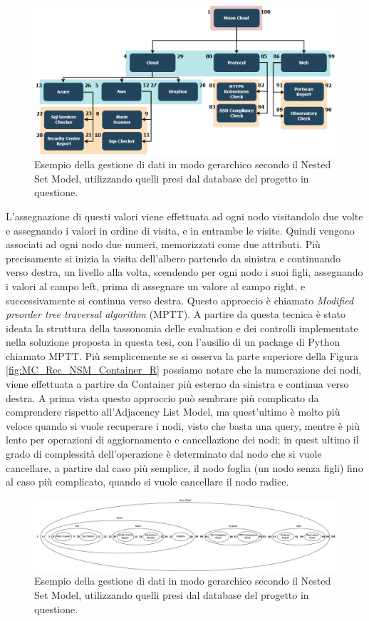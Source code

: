 \begin{figure}[ht!]
    \includegraphics[scale=0.40]{images/MC_Rec_NSM_Tree.png}
    \caption{Esempio della gestione di dati in modo gerarchico secondo il Nested Set Model, utilizzando quelli presi dal database del 
    progetto in questione.}
    \label{fig:MC_Rec_NSM_Tree}
\end{figure}
\hfill\break
L'assegnazione di questi valori viene effettuata ad ogni nodo visitandolo due volte e assegnando i valori in ordine di visita, e in entrambe le visite. 
Quindi vengono associati ad ogni nodo due numeri, memorizzati come due attributi.
Più precisamente si inizia la visita dell'albero partendo da sinistra e continuando verso destra, un livello alla volta, scendendo per ogni
nodo i suoi figli, assegnando i valori al campo left, prima di assegnare un valore al campo right, e successivamente si continua verso 
destra. Questo approccio è chiamato \textit{Modified preorder tree traversal algorithm} (MPTT). A partire da questa tecnica è stato 
ideata la struttura della tassonomia delle evaluation e dei controlli implementate nella soluzione proposta in questa tesi, con 
l'ausilio di un package di Python chiamato MPTT.\hfill\break
Più semplicemente se si osserva la parte superiore della Figura \ref{fig:MC_Rec_NSM_Container_R} possiamo notare che la numerazione dei nodi, viene
effettuata a partire da Container più esterno da sinistra e continua verso destra.\hfill\break
A prima vista questo approccio può sembrare più complicato da comprendere rispetto all'Adjacency List Model, ma quest'ultimo è
molto più veloce quando si vuole recuperare i nodi, visto che basta una query, mentre è più lento per operazioni di aggiornamento e 
cancellazione dei nodi; in quest ultimo il grado di complessità dell'operazione è determinato dal nodo che si vuole cancellare, a 
partire dal caso più semplice, il nodo foglia (un nodo senza figli) fino al caso più complicato, quando si vuole cancellare il nodo 
radice.
%
\begin{figure}
    \centering
    \includegraphics[scale=0.4]{images/MC_Rec_NSM_Container.png}
    \caption{Esempio della gestione di dati in modo gerarchico secondo il Nested Set Model, utilizzando quelli presi dal database del 
    progetto in questione.}
    \label{fig:MC_Rec_NSM_Container}
\end{figure}
%
\newpage
%
